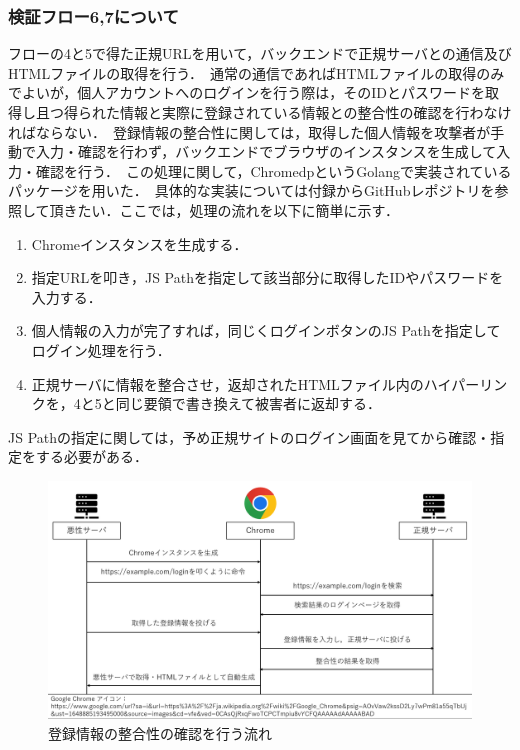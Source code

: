 \documentclass[dvipdfmx]{jsarticle}
\begin{document}
            \subsubsection{検証フロー6,7について}
                フローの4と5で得た正規URLを用いて，バックエンドで正規サーバとの通信及びHTMLファイルの取得を行う．\
                通常の通信であればHTMLファイルの取得のみでよいが，個人アカウントへのログインを行う際は，そのIDとパスワードを取得し且つ得られた情報と実際に登録されている情報との整合性の確認を行わなければならない．\
                登録情報の整合性に関しては，取得した個人情報を攻撃者が手動で入力・確認を行わず，バックエンドでブラウザのインスタンスを生成して入力・確認を行う．\
                この処理に関して，ChromedpというGolangで実装されているパッケージを用いた．\
                具体的な実装については付録からGitHubレポジトリを参照して頂きたい．ここでは，処理の流れを以下に簡単に示す．\
                \begin{enumerate}
                    \item Chromeインスタンスを生成する．
                    \item 指定URLを叩き，JS Pathを指定して該当部分に取得したIDやパスワードを入力する．
                    \item 個人情報の入力が完了すれば，同じくログインボタンのJS Pathを指定してログイン処理を行う．
                    \item 正規サーバに情報を整合させ，返却されたHTMLファイル内のハイパーリンクを，4と5と同じ要領で書き換えて被害者に返却する．
                \end{enumerate}
                JS Pathの指定に関しては，予め正規サイトのログイン画面を見てから確認・指定をする必要がある．\
                \begin{figure}
                    \centering
                    \includegraphics[width=15cm]{img/vc-vf-6-7.png}
                    \caption{登録情報の整合性の確認を行う流れ}
                    \label{flow-6-7}
                \end{figure}
                \clearpage
\end{document}
